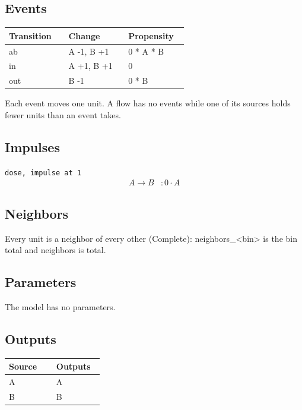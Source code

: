 \documentclass{article}
\begin{document}
\subsection*{Events}
\begin{longtable}{p{0.3\linewidth}p{0.3\linewidth}p{0.3\linewidth}}
Transition & Change & Propensity \\
\hline
\endhead
ab & A -1, B +1 & 0 * A * B \\
in & A +1, B +1 & 0 \\
out & B -1 & 0 * B \\
\end{longtable}
Each event moves one unit. A flow has no events while one of its sources holds fewer units than an event takes.

\subsection*{Impulses}
\noindent\texttt{dose, impulse at 1}
\begin{align*}
A \to B &: 0 \cdot A
\end{align*}
\subsection*{Neighbors}
Every unit is a neighbor of every other (Complete): neighbors\_\textless{}bin\textgreater{} is the bin total and neighbors is total.

\subsection*{Parameters}
The model has no parameters.

\subsection*{Outputs}
\begin{longtable}{p{0.45\linewidth}p{0.45\linewidth}}
Source & Outputs \\
\hline
\endhead
A & A \\
B & B \\
\end{longtable}
\end{document}
